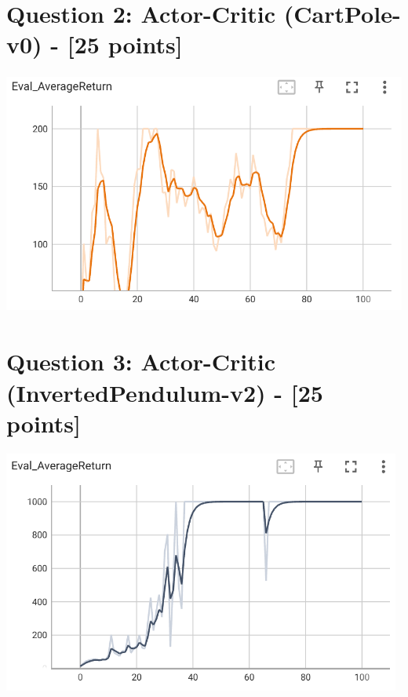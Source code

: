 \documentclass{article}
\begin{document}
\section{Question 2: Actor-Critic (CartPole-v0) - [25 points]}
\begin{answer}[title=Question 2,height=9.5cm,width=\linewidth]
\centering
\includegraphics[height=8cm]{hw3/q2.png}
\end{answer}



\section{Question 3: Actor-Critic (InvertedPendulum-v2) - [25 points]}
\begin{answer}[title=Question 3,height=9.5cm,width=\linewidth]
\centering
\includegraphics[height=8cm]{hw3/q3.png}
\end{answer}
\end{document}
